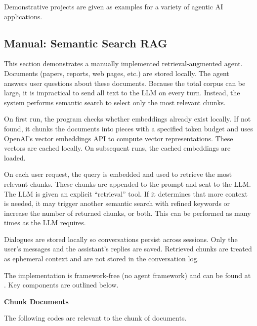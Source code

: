 Demonstrative projects are given as examples for a variety of agentic AI applications. 

\subsection{Manual: Semantic Search RAG}

This section demonstrates a manually implemented retrieval‑augmented agent. Documents (papers, reports, web pages, etc.) are stored locally. The agent answers user questions about these documents. Because the total corpus can be large, it is impractical to send all text to the LLM on every turn. Instead, the system performs semantic search to select only the most relevant chunks.

On first run, the program checks whether embeddings already exist locally. If not found, it chunks the documents into pieces with a specified token budget and uses OpenAI’s vector embeddings API to compute vector representations. These vectors are cached locally. On subsequent runs, the cached embeddings are loaded.

On each user request, the query is embedded and used to retrieve the most relevant chunks. These chunks are appended to the prompt and sent to the LLM. The LLM is given an explicit ``retrieval'' tool. If it determines that more context is needed, it may trigger another semantic search with refined keywords or increase the number of returned chunks, or both. This can be performed as many times as the LLM requires.

Dialogues are stored locally so conversations persist across sessions. Only the user’s messages and the assistant’s replies are saved. Retrieved chunks are treated as ephemeral context and are not stored in the conversation log.

The implementation is framework‑free (no agent framework) and can be found at \cite{sun2025document}. Key components are outlined below.

\vspace{0.1in}
\noindent \textbf{Chunk Documents}
\vspace{0.1in}

The following codes are relevant to the chunk of documents.

